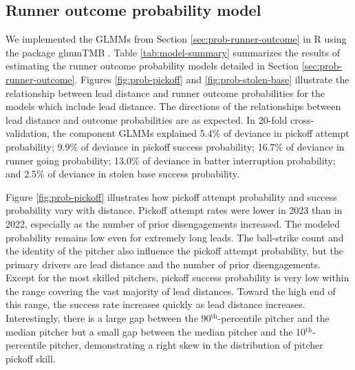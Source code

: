 \documentclass[aoas]{imsart}
\newcommand{\tablepath}{../../output/tables/}
\newcommand{\inputtable}[1]{}
\begin{document}
    \subsection{Runner outcome probability model}
    \label{sec:results-multilevel-model}

      We implemented the GLMMs from Section \ref{sec:prob-runner-outcome} in R using the package glmmTMB \citep{brooks_glmmtmb_2017}. Table \ref{tab:model-summary} summarizes the results of estimating the runner outcome probability models detailed in Section \ref{sec:prob-runner-outcome}. Figures \ref{fig:prob-pickoff} and \ref{fig:prob-stolen-base} illustrate the relationship between lead distance and runner outcome probabilities for the models which include lead distance. The directions of the relationships between lead distance and outcome probabilities are as expected. In 20-fold cross-validation, the component GLMMs explained 5.4\% of deviance in pickoff attempt probability; 9.9\% of deviance in pickoff success probability; 16.7\% of deviance in runner going probability; 13.0\% of deviance in batter interruption probability; and 2.5\% of deviance in stolen base success probability.

      \begin{table}
        \resizebox{\linewidth}{!}{
          \inputtable{model_summary.tex}
        }
        \caption{
          \it Summary of estimated runner outcome probability models. We estimated four different generalized (binomial) linear mixed-effects models for pickoff (PO) attempt and success and for stolen base (SB) attempt and success. For fixed effects we report the estimated effect with one standard error, and for random effects we report the estimated standard deviation term. For 2022, we coded disengagements as always zero to reflect no pickoff limit.
        }
        \label{tab:model-summary}
       \end{table}
      
      Figure \ref{fig:prob-pickoff} illustrates how pickoff attempt probability and success probability vary with distance. Pickoff attempt rates were lower in 2023 than in 2022, especially as the number of prior disengagements increased. The modeled probability remains low even for extremely long leads. The ball-strike count and the identity of the pitcher also influence the pickoff attempt probability, but the primary drivers are lead distance and the number of prior disengagements. Except for the most skilled pitchers, pickoff success probability is very low within the range covering the vast majority of lead distances. Toward the high end of this range, the success rate increases quickly as lead distance increases. Interestingly, there is a large gap between the 90$^\text{th}$-percentile pitcher and the median pitcher but a small gap between the median pitcher and the 10$^\text{th}$-percentile pitcher, demonstrating a right skew in the distribution of pitcher pickoff skill.
 
\end{document}
